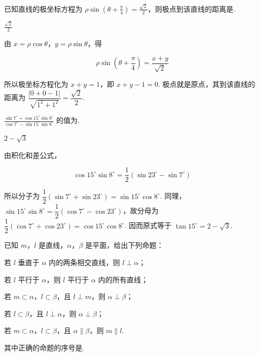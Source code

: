 \begin{problem}
已知直线的极坐标方程为 \(\rho \sin \left(\theta + \frac{\pi}{4}\right) = \frac{\sqrt{2}}{2}\)，则极点到该直线的距离是\fillinblank{}.
\end{problem}

\begin{answer}
\(\frac{\sqrt{2}}{2}\)
\end{answer}

\begin{solution}
由 \(x=\rho\cos\theta\)，\(y=\rho\sin\theta\)，得

\[
\rho\sin\left(\theta+\frac{\pi}{4}\right)=\frac{x+y}{\sqrt{2}}
\]

所以极坐标方程化为 \(x+y=1\)，即 \(x+y-1=0\). 极点就是原点，其到该直线的距离为 \(\dfrac{|0+0-1|}{\sqrt{1^{2}+1^{2}}}=\dfrac{\sqrt{2}}{2}\).
\end{solution}

\begin{problem}
\(\frac{\sin 7^{\circ} + \cos 15^{\circ} \sin 8^{\circ}}{\cos 7^{\circ} - \sin 15^{\circ} \sin 8^{\circ}}\) 的值为\fillinblank{}.
\end{problem}

\begin{answer}
\(2 - \sqrt{3}\)
\end{answer}

\begin{solution}
由积化和差公式，

\[
\cos15^{\circ}\sin8^{\circ}=\frac12\left(\sin23^{\circ}-\sin7^{\circ}\right)
\]

所以分子为 \(\dfrac12(\sin7^{\circ}+\sin23^{\circ})=\sin15^{\circ}\cos8^{\circ}\). 同理，\(\sin15^{\circ}\sin8^{\circ}=\dfrac12(\cos7^{\circ}-\cos23^{\circ})\)，故分母为 \(\dfrac12(\cos7^{\circ}+\cos23^{\circ})=\cos15^{\circ}\cos8^{\circ}\). 因而原式等于 \(\tan15^{\circ}=2-\sqrt{3}\).
\end{solution}

\begin{problem}
已知 \(m\)，\(l\) 是直线，\(\alpha\)，\(\beta\) 是平面，给出下列命题：

\begin{circlelist}
\item 若 \(l\) 垂直于 \(\alpha\) 内的两条相交直线，则 \(l \perp \alpha\)；
\item 若 \(l\) 平行于 \(\alpha\)，则 \(l\) 平行于 \(\alpha\) 内的所有直线；
\item 若 \(m \subset \alpha\)，\(l \subset \beta\)，且 \(l \perp m\)，则 \(\alpha \perp \beta\)；
\item 若 \(l \subset \beta\)，且 \(l \perp \alpha\)，则 \(\alpha \perp \beta\)；
\item 若 \(m \subset \alpha\)，\(l \subset \beta\)，且 \(\alpha \parallel \beta\)，则 \(m \parallel l\).
\end{circlelist}

其中正确的命题的序号是\fillinblank{}.
\end{problem}

